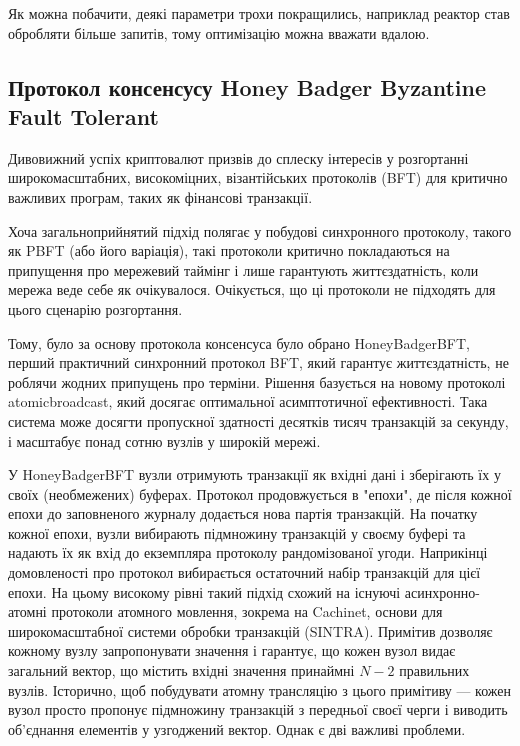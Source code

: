\documentclass{lib/styles/default-style}
\begin{document}
    Як можна побачити, деякі параметри трохи покращились, наприклад реактор став обробляти більше запитів, тому оптимізацію можна вважати вдалою.

\subsection{Протокол консенсусу Honey Badger Byzantine Fault Tolerant}

    Дивовижний успіх криптовалют призвів до сплеску інтересів у розгортанні широкомасштабних,
    високоміцних, візантійських протоколів (BFT) для критично важливих програм,
    таких як фінансові транзакції.
    
    Хоча загальноприйнятий підхід полягає у побудові синхронного протоколу, такого як PBFT (або його варіація),
    такі протоколи критично покладаються на припущення про мережевий таймінг і лише гарантують життєздатність,
    коли мережа веде себе як очікувалося. Очікується, що ці протоколи не підходять для цього сценарію розгортання.
    
    Тому, було за основу протокола консенсуса було обрано HoneyBadgerBFT,
    перший практичний синхронний протокол BFT, який гарантує життєздатність,
    не роблячи жодних припущень про терміни. Рішення базується на новому протоколі atomicbroadcast,
    який досягає оптимальної асимптотичної ефективності. Така система може досягти пропускної здатності десятків тисяч транзакцій за секунду,
    і масштабує понад сотню вузлів у широкій мережі.

    У HoneyBadgerBFT вузли отримують транзакції як вхідні дані і зберігають їх у своїх
    (необмежених) буферах.
    Протокол продовжується в "епохи", де після кожної епохи до заповненого журналу додається нова партія транзакцій.
    На початку кожної епохи, вузли вибирають підмножину транзакцій у своєму буфері
    та надають їх як вхід до екземпляра протоколу рандомізованої угоди.
    Наприкінці домовленості про протокол вибирається остаточний набір транзакцій для цієї епохи.
    На цьому високому рівні такий підхід схожий на існуючі асинхронно-атомні протоколи атомного мовлення,
    зокрема на Cachinet, основи для широкомасштабної системи обробки транзакцій (SINTRA).
    Примітив дозволяє кожному вузлу запропонувати значення і гарантує, що кожен вузол видає загальний вектор,
    що містить вхідні значення принаймні $N-2$ правильних вузлів.
    Історично, щоб побудувати атомну трансляцію з цього примітиву --- кожен вузол просто пропонує підмножину транзакцій
    з передньої своєї черги і виводить об'єднання елементів у узгоджений вектор. Однак є дві важливі проблеми.
\end{document}
